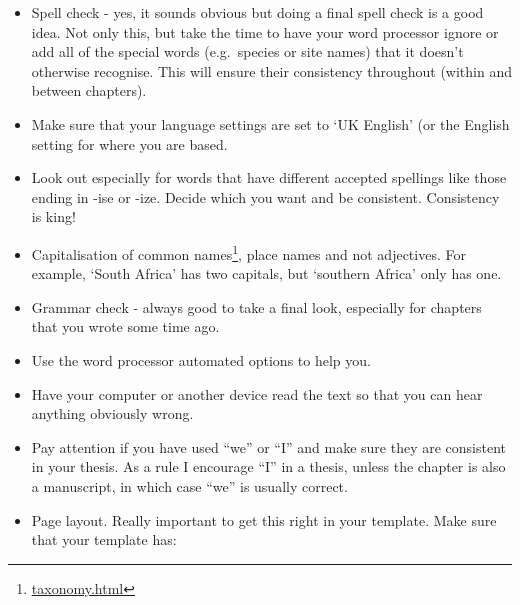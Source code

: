 \documentclass[
]{krantz}
\providecommand{\tightlist}{%
  \setlength{\itemsep}{0pt}\setlength{\parskip}{0pt}}
\renewcommand{\href}[2]{#2\footnote{\url{#1}}}
\begin{document}
\begin{itemize}
\tightlist
\item
  Spell check - yes, it sounds obvious but doing a final spell check is a good idea. Not only this, but take the time to have your word processor ignore or add all of the special words (e.g.~species or site names) that it doesn't otherwise recognise. This will ensure their consistency throughout (within and between chapters).
\item
  Make sure that your language settings are set to `UK English' (or the English setting for where you are based.
\item
  Look out especially for words that have different accepted spellings like those ending in -ise or -ize. Decide which you want and be consistent. Consistency is king!
\item
  Capitalisation of \href{taxonomy.html}{common names}, place names and not adjectives. For example, `South Africa' has two capitals, but `southern Africa' only has one.
\item
  Grammar check - always good to take a final look, especially for chapters that you wrote some time ago.
\item
  Use the word processor automated options to help you.
\item
  Have your computer or another device read the text so that you can hear anything obviously wrong.
\item
  Pay attention if you have used ``we'' or ``I'' and make sure they are consistent in your thesis. As a rule I encourage ``I'' in a thesis, unless the chapter is also a manuscript, in which case ``we'' is usually correct.
\item
  Page layout. Really important to get this right in your template. Make sure that your template has:


\end{itemize}
\end{document}
